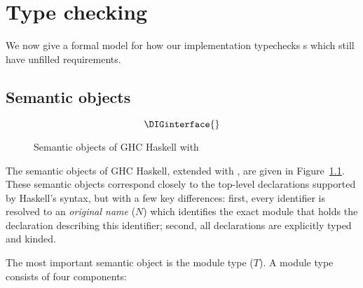 \chapter{Type checking}
\label{sec:compiler}

We now give a formal model for how our implementation typechecks
\unit{}s which still have unfilled requirements.


\section{Semantic objects}
\label{sec:semantic-objects}

\begin{figure}
\[ \DIGinterface{} \]
\caption{Semantic objects of GHC Haskell with \Backpack{}}
\label{fig:semantic-objects}
\end{figure}

The semantic objects of GHC Haskell, extended with \Backpack{}, are
given in Figure~\ref{fig:semantic-objects}.  These semantic objects
correspond closely to the top-level declarations supported by
Haskell's syntax, but with a few key differences: first, every
identifier is resolved to an \emph{original name} ($N$) which identifies
the exact module that holds the declaration describing this identifier;
second, all declarations are explicitly typed and kinded.

The most important semantic object is the module type ($T$).  A module
type consists of four components:

